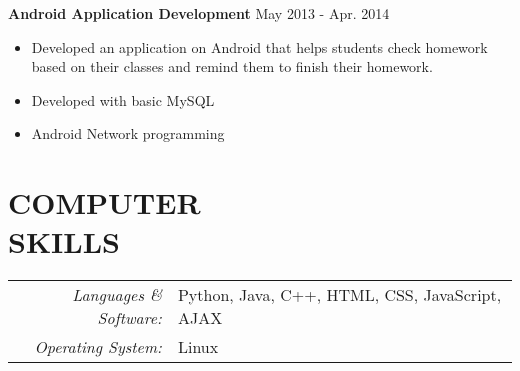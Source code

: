 \documentclass[margin,10pt]{res} %
\begin{document}
\begin{resume}

{\bf Android Application Development} \hfill May 2013 - Apr. 2014 \\
\begin{itemize}
\item Developed an application on Android that helps students check homework based on their classes and remind them to finish their homework.
\item Developed with basic MySQL
\item Android Network programming
\end{itemize}



\section{COMPUTER \\ SKILLS}
\begin{tabular}{rl}
{\sl Languages \& Software:}
& Python, Java, C++, HTML, CSS, JavaScript, AJAX \\
{\sl Operating System:}
& Linux\\
\end{tabular}



\end{resume}
\end{document}
